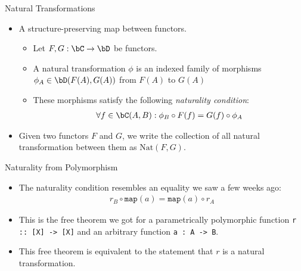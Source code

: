 \begin{frame}{Natural Transformations}
    \begin{itemize}
     \item A structure-preserving map between functors.
     \begin{itemize}
      \item Let $F,G : \bC \to \bD$ be functors.
      \item A natural transformation $\phi$ is an indexed family of morphisms $\phi_A \in \bD(F(A), G(A))$ from $F(A)$ to $G(A)$
      \item These morphisms satisfy the following \textit{naturality condition}:
      \begin{align*}
       \forall f \in \bC(A,B) : \phi_B \circ F(f) = G(f) \circ \phi_A
      \end{align*}
     \end{itemize}
     \item Given two functors $F$ and $G$, we write the collection of all natural transformation between them as $\text{Nat}(F, G)$.
    \end{itemize}
\end{frame}
\begin{frame}{Naturality from Polymorphism}
    \begin{itemize}
      \item The naturality condition resembles an equality we saw a few weeks ago:
      \begin{align*}
       r_B \circ \texttt{map}(a) = \texttt{map}(a) \circ r_A
      \end{align*}
      \pause \item This is the free theorem we got for a parametrically polymorphic function \texttt{r :: [X] -> [X]} and an arbitrary function \texttt{a : A -> B}.
      \pause \item This free theorem is equivalent to the statement that $r$ is a natural transformation.
    \end{itemize}
\end{frame}
